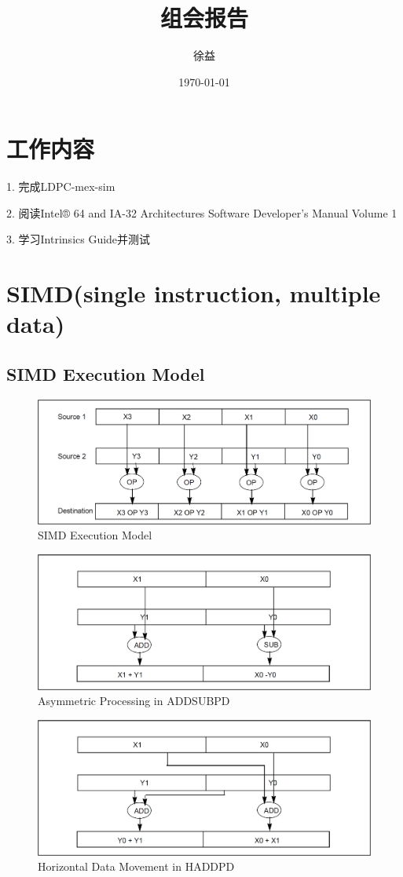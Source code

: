 \documentclass{article}
\title{组会报告}
\author{徐益}
\date{\today}
\begin{document}
\maketitle


\section{工作内容}
1. 完成LDPC-mex-sim

2. 阅读Intel® 64 and IA-32 Architectures Software Developer’s Manual Volume 1

3. 学习Intrinsics Guide并测试

\section{SIMD(single instruction, multiple data)}
\subsection{SIMD Execution Model}
\begin{figure}[H]
	\centering
	\includegraphics[width = .8\textwidth]{SIMD_Execution_Model.png}
	\caption{SIMD Execution Model}
\end{figure}
\begin{figure}[H]
	\centering
	\includegraphics[width = .8\textwidth]{Asymmetric_Processing_in_ADDSUBPD.png}
	\caption{Asymmetric Processing in ADDSUBPD}
\end{figure}
\begin{figure}[H]
	\centering
	\includegraphics[width = .8\textwidth]{Horizontal_Data_Movement_in_HADDPD.png}
	\caption{Horizontal Data Movement in HADDPD}
\end{figure}
\end{document}
